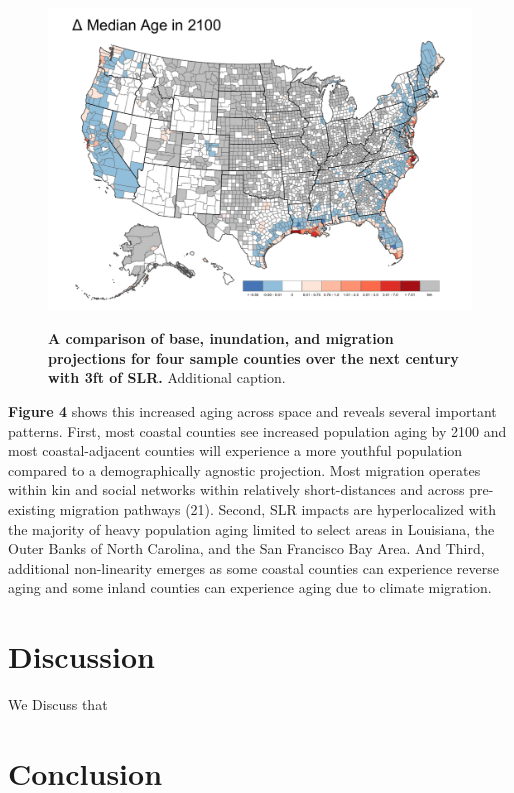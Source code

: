 \documentclass[9pt,twocolumn,twoside,]{pnas-new}
\begin{document}
\begin{figure}
\includegraphics{FigMedAgeMap.pdf}\label{FigMedAgeMap}
\caption{\textbf{A comparison of base, inundation, and migration projections for four sample counties over the next century with 3ft of SLR.} Additional caption.}
\end{figure}

\textbf{Figure 4} shows this increased aging across space and reveals
several important patterns. First, most coastal counties see increased
population aging by 2100 and most coastal-adjacent counties will
experience a more youthful population compared to a demographically
agnostic projection. Most migration operates within kin and social
networks within relatively short-distances and across pre-existing
migration pathways (21). Second, SLR impacts are hyperlocalized with the
majority of heavy population aging limited to select areas in Louisiana,
the Outer Banks of North Carolina, and the San Francisco Bay Area. And
Third, additional non-linearity emerges as some coastal counties can
experience reverse aging and some inland counties can experience aging
due to climate migration.

\hypertarget{discussion}{%
\section*{Discussion}\label{discussion}}

We Discuss that

\hypertarget{conclusion}{%
\section*{Conclusion}\label{conclusion}}
\end{document}
